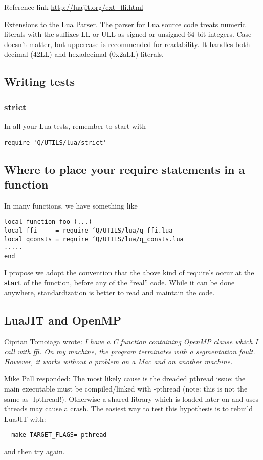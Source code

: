 Reference link \url{http://luajit.org/ext_ffi.html}

Extensions to the Lua Parser. 
The parser for Lua source code treats numeric literals with the suffixes LL
or ULL as signed or unsigned 64 bit integers. Case doesn't matter, but
uppercase is recommended for readability. It handles both decimal (42LL)
and hexadecimal (0x2aLL) literals.


\subsection{Writing tests}

\subsubsection{strict}

In all your Lua tests, remember to start with 
\begin{verbatim}
require 'Q/UTILS/lua/strict'
\end{verbatim}
\subsection{Where to place your require statements in a function}
In many functions, we have something like

\begin{verbatim}
local function foo (...)
local ffi     = require ‘Q/UTILS/lua/q_ffi.lua
local qconsts = require ‘Q/UTILS/lua/q_consts.lua
.....
end
\end{verbatim}

I propose we adopt the convention that the above kind of require’s occur 
at the {\bf start} of the function, before any of the ``real'' code.  While it can be 
done anywhere, standardization is better to read and maintain the code.


\subsection{LuaJIT and OpenMP}

Ciprian Tomoiaga wrote:
{\it I have a C function containing OpenMP clause which I call with ffi. On my
machine, the program terminates with a segmentation fault. However, it
works without a problem on a Mac and on another machine. }

Mike Pall responded: 
The most likely cause is the dreaded pthread issue: the main
executable must be compiled/linked with -pthread (note: this is
not the same as -lpthread!). Otherwise a shared library which is
loaded later on and uses threads may cause a crash.
The easiest way to test this hypothesis is to rebuild LuaJIT with:
\begin{verbatim}
  make TARGET_FLAGS=-pthread
\end{verbatim}
and then try again.

